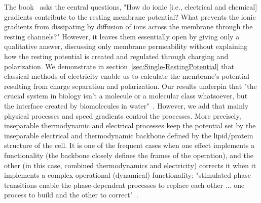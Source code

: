 The book~\cite{PrinciplesNeuralScience:2013} asks the central questions, "How do ionic [i.e., electrical and chemical] gradients contribute to the resting membrane potential? What prevents
the ionic gradients from dissipating by diffusion of
ions across the membrane through the resting channels?"
However, it leaves them essentially open by giving only a qualitative answer, discussing only membrane permeability without explaining how the resting potential is created and regulated through charging and polarization.
%
We demonstrate in section~\ref{sec:Single-RestingPotential} that classical methods of electricity enable us to calculate the membrane's potential resulting from charge separation and polarization.
Our results underpin that "the crucial system in biology isn't a molecule or a molecular class whatsoever, but the interface created by biomolecules in water"~\cite{LivingSystemPhysics:2021}. However, we add that mainly
physical processes and speed gradients control the processes.
More precisely, inseparable thermodynamic and electrical processes keep the potential set by the inseparable electrical and thermodynamic backbone defined by the lipid/protein structure of the cell. It is one of the frequent cases when 
one effect implements a functionality (the backbone closely defines the frames of the operation), and the other (in this case, combined thermodynamics and electricity) corrects it when it implements a complex operational (dynamical) functionality:
"stimulated phase transitions enable the phase-dependent processes to replace each other ... one process to build and the other
to correct"~\cite{BiologicalConservationLaw:2017}.


